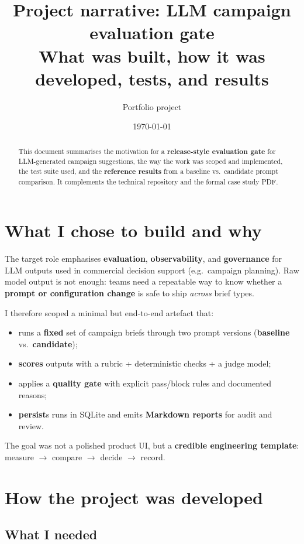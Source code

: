 \documentclass[11pt,a4paper]{article}
\title{\textbf{Project narrative: LLM campaign evaluation gate}\\[0.35em]
\large What was built, how it was developed, tests, and results}
\author{Portfolio project}
\date{\today}
\begin{document}
\maketitle

\begin{abstract}
\noindent
This document summarises the motivation for a \textbf{release-style evaluation gate} for LLM-generated campaign suggestions, the way the work was scoped and implemented, the test suite used, and the \textbf{reference results} from a baseline vs.\ candidate prompt comparison. It complements the technical repository and the formal case study PDF.
\end{abstract}

\section{What I chose to build and why}

The target role emphasises \textbf{evaluation}, \textbf{observability}, and \textbf{governance} for LLM outputs used in commercial decision support (e.g.\ campaign planning). Raw model output is not enough: teams need a repeatable way to know whether a \textbf{prompt or configuration change} is safe to ship \emph{across} brief types.

I therefore scoped a minimal but end-to-end artefact that:

\begin{itemize}
  \item runs a \textbf{fixed} set of campaign briefs through two prompt versions (\textbf{baseline} vs.\ \textbf{candidate});
  \item \textbf{scores} outputs with a rubric + deterministic checks + a judge model;
  \item applies a \textbf{quality gate} with explicit pass/block rules and documented reasons;
  \item \textbf{persist}s runs in SQLite and emits \textbf{Markdown reports} for audit and review.
\end{itemize}

The goal was not a polished product UI, but a \textbf{credible engineering template}: measure $\rightarrow$ compare $\rightarrow$ decide $\rightarrow$ record.

\section{How the project was developed}

\subsection{What I needed}
\end{document}
